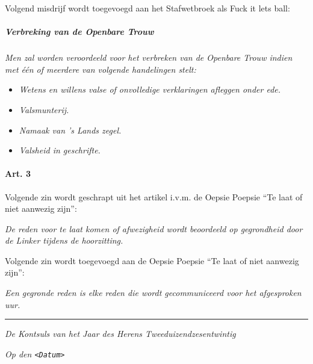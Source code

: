 Volgend misdrijf wordt toegevoegd aan het Stafwetbroek als Fuck it lets
ball:

\hypertarget{verbreking-van-de-openbare-trouw}{%
\subparagraph{\texorpdfstring{\emph{Verbreking van de Openbare
Trouw}}{Verbreking van de Openbare Trouw}}\label{verbreking-van-de-openbare-trouw}}

\emph{Men zal worden veroordeeld voor het verbreken van de Openbare
Trouw indien met één of meerdere van volgende handelingen stelt:}

\begin{itemize}
\tightlist
\item
  \emph{Wetens en willens valse of onvolledige verklaringen afleggen
  onder ede.}
\item
  \emph{Valsmunterij.}
\item
  \emph{Namaak van 's Lands zegel.}
\item
  \emph{Valsheid in geschrifte.}
\end{itemize}

\hypertarget{art.-3}{%
\paragraph{Art. 3}\label{art.-3}}

Volgende zin wordt geschrapt uit het artikel i.v.m. de Oepsie Poepsie
``Te laat of niet aanwezig zijn'':

\emph{De reden voor te laat komen of afwezigheid wordt beoordeeld op
gegrondheid door de Linker tijdens de hoorzitting.}

Volgende zin wordt toegevoegd aan de Oepsie Poepsie ``Te laat of niet
aanwezig zijn'':

\emph{Een gegronde reden is elke reden die wordt gecommuniceerd voor het
afgesproken uur.}

\begin{center}\rule{0.5\linewidth}{0.5pt}\end{center}

\emph{De Kontsuls van het Jaar des Herens Tweeduizendzesentwintig}

\emph{Op den \texttt{\textless{}Datum\textgreater{}}}
